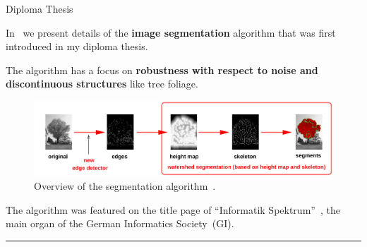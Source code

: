 \begin{frame}{Diploma Thesis }

\justifying

\vspace{2em}
In~\cite{Peters2007} we present details of the {\bf image 
segmentation} algorithm that was first introduced in my diploma thesis.

\vspace{1em}
The algorithm has a focus on {\bf robustness with respect to noise and 
discontinuous structures} like tree foliage. 

\vspace{1em}
\begin{figure}
\includegraphics[width=0.66\linewidth]{diploma_thesis/segmentation.jpg}

\vspace{-0.75em}
\caption{\scriptsize Overview of the segmentation algorithm~\cite{Peters2007}.}
\end{figure}

The algorithm was featured on the title page of ``Informatik 
Spektrum''~\cite{Kerdels2007}, the main organ of the German Informatics 
Society~(GI).

\begin{center}
\rule{2cm}{0.4pt}\\[0.5em]
\end{center}

\\[1em]

\end{frame}



